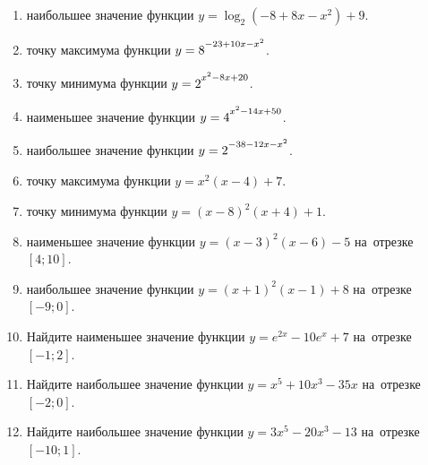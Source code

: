 \documentclass[a4paper,10pt]{article}
\begin{document}
\begin{enumerate}
\item {} наибольшее значение функции $y=\log_2\left(-8+8x-x^2\right)+9$.

\item {} точку максимума функции $y=8\strut^{-23+10x-x^2}$.

\item {} точку минимума функции $y=2\strut^{x^2-8x+20}$.

\item {} наименьшее значение функции $y=4\strut^{x^2-14x+50}$.

\item {} наибольшее значение функции $y=2\strut^{-38-12x-x^2}$.

\item {} точку максимума функции $y=x^2\left(x-4\right)+7$.

\item {} точку минимума функции $y=\left(x-8\right)^2\left(x+4\right)+1$.

\item {} наименьшее значение функции $y=\left(x-3\right)^2\left(x-6\right)-5$ на~отрезке~$\left[4;10\right]$.

\item {} наибольшее значение функции $y=\left(x+1\right)^2\left(x-1\right)+8$ на~отрезке~$\left[-9;0\right]$.

\item Найдите наименьшее значение функции $y=e^{2x}-10e^x+7$ на~отрезке~$\left[-1;2\right]$.

\item Найдите наибольшее значение функции $y=x^5+10x^3-35x$ на~отрезке~$\left[-2;0\right]$.

\item Найдите наибольшее значение функции $y=3x^5-20x^3-13$ на~отрезке~$\left[-10;1\right]$.

\end{enumerate}
\end{document}
